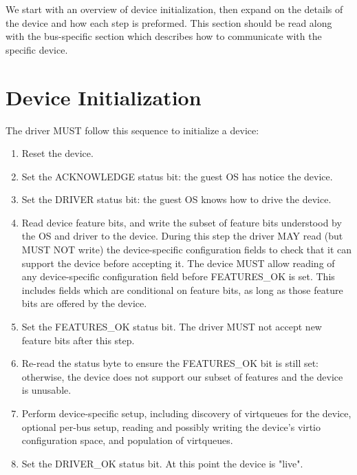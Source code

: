We start with an overview of device initialization, then expand on the
details of the device and how each step is preformed.  This section
should be read along with the bus-specific section which describes
how to communicate with the specific device.

\section{Device Initialization}\label{sec:General Initialization And Device Operation / Device Initialization}

The driver MUST follow this sequence to initialize a device:

\begin{enumerate}
\item Reset the device.

\item Set the ACKNOWLEDGE status bit: the guest OS has notice the device.

\item Set the DRIVER status bit: the guest OS knows how to drive the device.

\item Read device feature bits, and write the subset of feature bits
   understood by the OS and driver to the device.  During this step the
   driver MAY read (but MUST NOT write) the device-specific configuration fields to check that it can support the device before accepting it.
   The device MUST allow reading of any device-specific configuration field
   before FEATURES_OK is set.  This includes fields which are conditional
   on feature bits, as long as those feature bits are offered by the device.

\item\label{itm:General Initialization And Device Operation / Device Initialization / Set FEATURES-OK} Set the FEATURES_OK status bit.  The driver MUST not accept
   new feature bits after this step.

\item\label{itm:General Initialization And Device Operation / Device Initialization / Re-read FEATURES-OK} Re-read the status byte to ensure the FEATURES_OK bit is still
   set: otherwise, the device does not support our subset of features
   and the device is unusable.

\item\label{itm:General Initialization And Device Operation / Device Initialization / Device-specific Setup} Perform device-specific setup, including discovery of virtqueues for the
   device, optional per-bus setup, reading and possibly writing the
   device's virtio configuration space, and population of virtqueues.

\item\label{itm:General Initialization And Device Operation / Device Initialization / Set DRIVER-OK} Set the DRIVER_OK status bit.  At this point the device is
   "live".
\end{enumerate}

